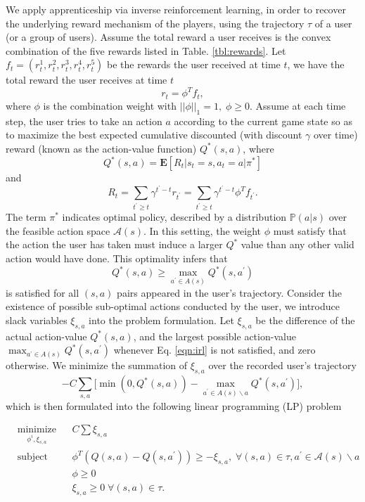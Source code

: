 \documentclass[a4paper]{article}
\begin{document}
We apply apprenticeship via inverse reinforcement learning, in order to recover the underlying reward mechanism of the players, using the trajectory $\tau$ of a user (or a group of users). Assume the total reward a user receives is the convex combination of the five rewards listed in Table. \ref{tbl:rewards}. Let $f_t=(r_t^1,r_t^2,r_t^3,r_t^4,r_t^5)$ be the rewards the user received at time $t$, we have the total reward the user receives at time $t$ $$r_t=\phi^Tf_t,$$ 
where $\phi$ is the combination weight with $||\phi||_1=1, \; \phi \geq 0$. Assume at each time step, the user tries to take an action $a$ according to the current game state so as to maximize the best expected cumulative discounted (with discount $\gamma$ over time) reward (known as the action-value function) $Q^\ast(s, a)$, where
$$Q^\ast(s,a)=\mathbf{E}[R_t | s_{t}=s, a_{t}=a | \pi^\ast]$$
and
$$R_t=\sum_{t^\prime\geq t}\gamma^{t^\prime-t}r_{t^\prime}=\sum_{t^\prime\geq t}\gamma^{t^\prime-t}\phi^Tf_{t^\prime}.$$
The term $\pi^\ast$ indicates optimal policy, described by a distribution $\mathbb{P}(a|s)$ over the feasible action space $\mathcal{A}(s)$. In this setting, the weight $\phi$ must satisfy that the action the user has taken must induce a larger $Q^\ast$ value than any other valid action would have done. This optimality infers that
\begin{equation}
Q^\ast(s,a) \geq \max_{a^\prime \in A(s)}Q^\ast(s,a^\prime) \label{eqn:irl}
\end{equation}
is satisfied for all $(s,a)$ pairs appeared in the user's trajectory. Consider the existence of possible sub-optimal actions conducted by the user, we introduce slack variables $\xi_{s,a}$ into the problem formulation. Let $\xi_{s,a}$ be the difference of the actual action-value $Q^\ast(s,a)$, and the largest possible action-value $\max_{a^\prime \in A(s)}Q^\ast(s,a^\prime)$ whenever Eq. \eqref{eqn:irl} is not satisfied, and zero otherwise. We minimize the summation of $\xi_{s,a}$ over the recorded user's trajectory
$$-C\sum_{s,a} \big[\min(0, Q^\ast(s,a)) - \max_{a^\prime \in A(s)\backslash a}Q^\ast(s,a^\prime)\big],$$
which is then formulated into the following linear programming (LP) problem

\begin{equation*}
\begin{aligned}
& \underset{\phi^i, \xi_{s,a}}{\text{minimize}}
& & C\sum \xi_{s,a} \\
& \text{subject to}
& & \phi^T(Q(s,a)-Q(s,a^\prime)) \geq - \xi_{s,a}, \; \forall (s,a) \in \tau, a^\prime \in \mathcal{A}(s)\backslash a \\
&&& \phi \geq 0 \; \\
&&& \xi_{s,a} \geq 0 \; \forall (s,a) \in \tau.
\label{eqn:lp}
\end{aligned}
\end{equation*}
\end{document}
